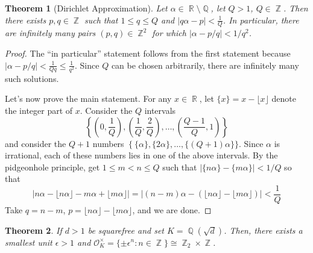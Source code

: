 \documentclass[11pt, a4paper]{memoir}
\DeclareMathOperator{\Q}{{\mathbb{Q}}}
\DeclareMathOperator{\Z}{{\mathbb{Z}}}
\DeclareMathOperator{\R}{{\mathbb{R}}}
\theoremstyle{change}
\newtheorem{theorem}{Theorem}[section]
\theoremstyle{plain}
\theoremstyle{nonumberplain}
\newtheorem{proof}{Proof}
\begin{document}
\begin{theorem}[Dirichlet Approximation]
    Let $\alpha\in\R\setminus\Q$, let $Q>1$, $Q\in\Z$.
    Then there exists $p,q\in\Z$ such that $1\leq q\leq Q$ and $|q\alpha-p|<\frac{1}{Q}$.
    In particular, there are infinitely many pairs $(p,q)\in\Z^2$ for which $|\alpha-p/q|<1/q^2$.
\end{theorem}
\begin{proof}
    The ``in particular'' statement follows from the first statement because $|\alpha-p/q|<\frac{1}{Qq}\leq\frac{1}{q^2}$.
    Since $Q$ can be chosen arbitrarily, there are infinitely many such solutions.

    Let's now prove the main statement.
    For any $x\in\R$, let $\{x\}=x-\lfloor x\rfloor$ denote the integer part of $x$.
    Consider the $Q$ intervals
    \begin{equation*}
        \left\{\left(0,\frac{1}{Q}\right),\left(\frac{1}{Q},\frac{2}{Q}\right),\ldots,\left(\frac{Q-1}{Q},1\right)\right\}
    \end{equation*}
    and consider the $Q+1$ numbers $\left\{\{\alpha\},\{2\alpha\},\ldots,\{(Q+1)\alpha\}\}$.
    Since $\alpha$ is irrational, each of these numbers lies in one of the above intervals.
    By the pidgeonhole principle, get $1\leq m<n\leq Q$ such that $|\{n\alpha\}-\{m\alpha\}|<1/Q$ so that
    \begin{equation*}
        \left\lvert n\alpha-\lfloor n\alpha\rfloor-m\alpha+\lfloor m\alpha\rfloor\right\rvert=\left\lvert(n-m)\alpha-(\lfloor n\alpha\rfloor-\lfloor m\alpha\rfloor)\right\rvert<\frac{1}{Q}
    \end{equation*}
    Take $q=n-m$, $p=\lfloor n\alpha\rfloor-\lfloor m\alpha\rfloor$, and we are done.
\end{proof}
\begin{theorem}
    If $d>1$ be squarefree and set $K=\Q(\sqrt{d})$.
    Then, there exists a smallest unit $\epsilon>1$ and $\mathcal{O}_K^\times=\{\pm\epsilon^n:n\in\Z\}\cong \Z_2\times\Z$.
\end{theorem}
\end{document}
